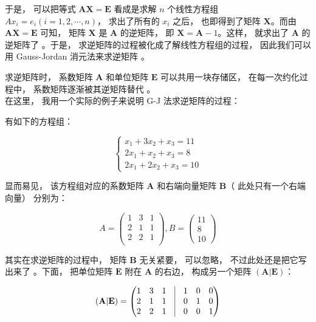 \documentclass[a4paper, 8pt]{article}
\newcommand{\matr}[1]{\mathbf{#1}}
\begin{document}
	于是， 可以把等式 $\hyperref[ax_eq_e]{\matr{AX=E}}$ 看成是求解 $n$ 个线性方程组 $Ax_i=e_i (i=1,2,\cdots,n)$， 求出了所有的 $x_i$ 之后， 也即得到了矩阵 $\matr{X}$。而由 $\hyperref[ax_eq_e]{\matr{AX=E}}$ 可知， 矩阵 $\matr{X}$ 是 $\matr{A}$ 的逆矩阵， 即 $\matr{X}=\matr{A}-1$。这样， 就求出了 $\matr{A}$ 的逆矩阵了 。于是， 求逆矩阵的过程被化成了解线性方程组的过程， 因此我们可以用 Gauss-Jordan 消元法来求逆矩阵 。

	求逆矩阵时， 系数矩阵 $\matr{A}$ 和单位矩阵 $\matr{E}$ 可以共用一块存储区， 在每一次约化过程中， 系数矩阵逐渐被其逆矩阵替代 。 \\

	在这里， 我用一个实际的例子来说明 G-J 法求逆矩阵的过程：

有如下的方程组：

\begin{equation}
\left\{\begin{array}{lr}
x_1 + 3x_2 + x_3 = 11 \\
2x_1 + x_2 + x_3 = 8 \\
2x_1 + 2x_2 + x_3 = 10
\end{array}\right.
\end{equation}

显而易见， 该方程组对应的系数矩阵 $\matr{A}$ 和右端向量矩阵 $\matr{B}$（ 此处只有一个右端向量） 分别为：

\begin{equation}
A = \begin{pmatrix}
1 & 3 & 1 \\
2 & 1 & 1 \\
2 & 2 & 1 \\
\end{pmatrix}, B = \begin{pmatrix}
11 \\ 8 \\ 10
\end{pmatrix}
\end{equation}

其实在求逆矩阵的过程中， 矩阵 $\matr{B}$ 无关紧要， 可以忽略， 不过此处还是把它写出来了 。下面， 把单位矩阵 $\matr{E}$ 附在 $\matr{A}$ 的右边， 构成另一个矩阵 $(\matr{A}|\matr{E})$：

\begin{equation}
(\matr{A}|\matr{E}) = \begin{pmatrix}
1 & 3 & 1 & \vline & 1&0&0 \\
2 & 1 & 1 & \vline & 0&1&0 \\
2 & 2 & 1 & \vline & 0&0&1\\
\end{pmatrix}
\end{equation}
\end{document}
